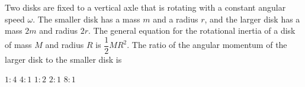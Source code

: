 \documentclass{../../oss-classkick-exam}
\begin{document}
\begin{multicols*}{2}
\begin{questions}
    
    \question Two disks are fixed to a vertical axle that is rotating with a
    constant angular speed $\omega$. The smaller disk has a mass $m$ and a
    radius $r$, and the larger disk has a mass $2m$ and radius $2r$. The
    general equation for the rotational inertia of a disk of mass $M$ and
    radius $R$ is $\dfrac12MR^2$. The ratio of the angular momentum of the
    larger disk to the smaller disk is
    \begin{choices}
      \choice $1:4$
      \choice $4:1$
      \choice $1:2$
      \choice $2:1$
      \choice $8:1$
    \end{choices}


\end{questions}
\end{multicols*}
\end{document}
